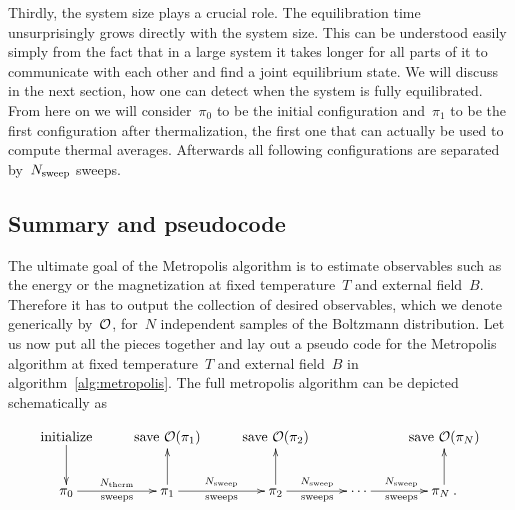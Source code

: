 Thirdly, the system size plays a crucial role. The equilibration time
unsurprisingly grows directly with the system size. This can be understood
easily simply from the fact that in a large system it takes longer for all parts
of it to communicate with each other and find a joint equilibrium state. We will
discuss in the next section, how one can detect when the system is fully
equilibrated. From here on we will consider~$\pi_0$ to be the initial
configuration and~$\pi_1$ to be the first configuration after thermalization,
\ie{} the first one that can actually be used to compute thermal averages.
Afterwards all following configurations are separated by~$N_{\mathrm{sweep}}$ sweeps.

\subsection{Summary and pseudocode}

The ultimate goal of the Metropolis algorithm is to estimate observables such as
the energy or the magnetization at fixed temperature~$T$ and external field~$B$.
Therefore it has to output the collection of desired observables, which we
denote generically by~$\mathcal{O}$, for~$N$ independent samples of the Boltzmann
distribution. Let us now put all the pieces together and lay out a pseudo code
for the Metropolis algorithm at fixed temperature~$T$ and external field~$B$ in
algorithm~\ref{alg:metropolis}. The full metropolis algorithm can be depicted
schematically as

\begin{equation}
  \xymatrix{%
    \text{initialize} \ar[d]
      &\text{save } \cO(\pi_1)
      &\text{save } \cO(\pi_2)
      && \text{save } \cO(\pi_N) \\
    \pi_0 \ar[r]^{\Ntherm}_{\text{sweeps}}
    & \pi_1 \ar[r]^{\Nsweep}_{\text{sweeps}} \ar[u]
    & \pi_2 \ar[r]^{\Nsweep}_{\text{sweeps}} \ar[u]
    & \cdots \ar[r]^{\Nsweep}_{\text{sweeps}}
    & \pi_N \:. \ar[u]
  }
\end{equation}

